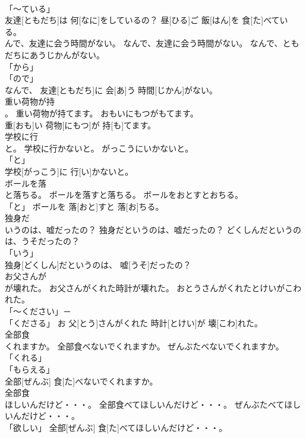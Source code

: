 \documentclass[8pt]{extreport}
\begin{document}
\begin{CJK}{UTF8}{min}
\\	「～ている」 
\\	友達[ともだち]は 何[なに]をしているの？ 昼[ひる]ご 飯[はん]を 食[た]べている。		
\\	んで、友達に会う時間がない。	なんで、友達に会う時間がない。	なんで、ともだちにあうじかんがない。	
\\	「から」 
\\	「ので」 
\\	なんで、 友達[ともだち]に 会[あ]う 時間[じかん]がない。		
\\	重い荷物が持
\\	。	重い荷物が持てます。	おもいにもつがもてます。	
\\	重[おも]い 荷物[にもつ]が 持[も]てます。		
\\	学校に行
\\	と。	学校に行かないと。	がっこうにいかないと。	
\\	「と」
\\	学校[がっこう]に 行[い]かないと。		
\\	ボールを落
\\	と落ちる。	ボールを落すと落ちる。	ボールをおとすとおちる。	
\\	「と」	ボールを 落[おと]すと 落[お]ちる。		
\\	独身だ
\\	いうのは、嘘だったの？	独身だというのは、嘘だったの？	どくしんだというのは、うそだったの？	
\\	「いう」 
\\	独身[どくしん]だというのは、 嘘[うそ]だったの？		
\\	お父さんが
\\	が壊れた。	お父さんがくれた時計が壊れた。	おとうさんがくれたとけいがこわれた。	
\\	「～ください」－ 
\\	「くださる」	お 父[とう]さんがくれた 時計[とけい]が 壊[こわ]れた。		
\\	全部食
\\	くれますか。	全部食べないでくれますか。	ぜんぶたべないでくれますか。	
\\	「くれる」 
\\	「もらえる」 
\\	全部[ぜんぶ] 食[た]べないでくれますか。		
\\	全部食
\\	ほしいんだけど・・・。	全部食べてほしいんだけど・・・。	ぜんぶたべてほしいんだけど・・・。	
\\	「欲しい」	全部[ぜんぶ] 食[た]べてほしいんだけど・・・。		

\end{CJK}
\end{document}
